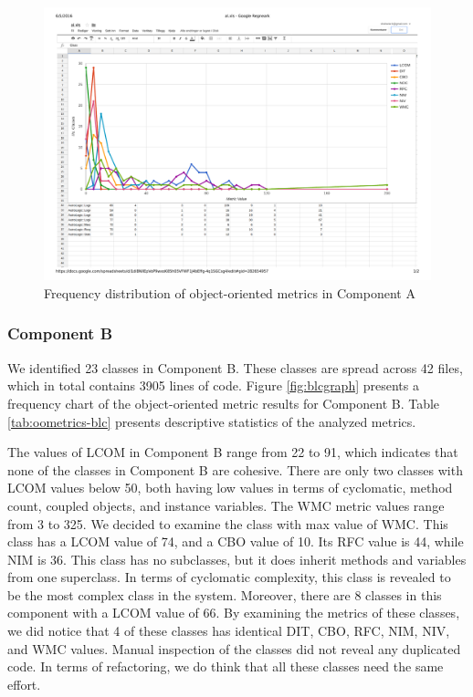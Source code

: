 

\begin{landscape}
\setlength\LTleft{-.5in}
	\begin{figure}
	\centering
	\includegraphics[width=\textwidth]{images/pdf/al.pdf}
	\caption{Frequency distribution of object-oriented metrics in Component A}
	\label{fig:algraph}
	\end{figure}
\end{landscape}





\subsubsection{Component B}
We identified 23 classes in Component B. These classes are spread across 42 files, which in total contains 3905 lines of code. Figure \ref{fig:blcgraph} presents a frequency chart of the object-oriented metric results for Component B. Table \ref{tab:oometrics-blc} presents descriptive statistics of the analyzed metrics.

The values of LCOM in Component B range from 22 to 91, which indicates that none of the classes in Component B are cohesive. There are only two classes with LCOM values below 50, both having low values in terms of cyclomatic, method count, coupled objects, and instance variables. The WMC metric values range from 3 to 325. We decided to examine the class with max value of WMC. This class has a LCOM value of 74, and a CBO value of 10. Its RFC value is 44, while NIM is 36. This class has no subclasses, but it does inherit methods and variables from one superclass. In terms of cyclomatic complexity, this class is revealed to be the most complex class in the system. Moreover, there are 8 classes in this component with a LCOM value of 66. By examining the metrics of these classes, we did notice that 4 of these classes has identical DIT, CBO, RFC, NIM, NIV, and WMC values. Manual inspection of the classes did not reveal any duplicated code. In terms of refactoring, we do think that all these classes need the same effort.

